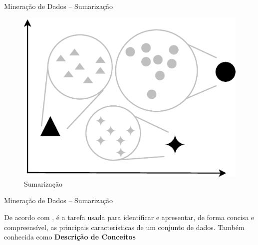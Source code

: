 \documentclass[hyperref={pdfpagelabels=false}]{beamer}
\begin{document}
\begin{frame}
    
    	\Large{Mineração de Dados -- Sumarização}
        \begin{figure}
		\centering
	    \includegraphics[scale=0.3]{img/Summarization.eps}
        \caption{\scriptsize{Sumarização}}
		\end{figure}
    

\end{frame}

\begin{frame}

    
    \Large{Mineração de Dados -- Sumarização}\linebreak
    \normalsize
   
    De acordo com \cite{goldschmidt2015data}, é a tarefa usada para identificar e apresentar, de forma concisa e compreensível, as principais características de um conjunto de dados.
    \linebreak\linebreak Também conhecida como \textbf{Descrição de Conceitos}

\end{frame}
\end{document}
